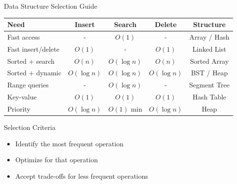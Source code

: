 \documentclass[aspectratio=169,xcolor=dvipsnames]{beamer}
\begin{document}
\begin{frame}{Data Structure Selection Guide}
  \begin{table}
    \centering
    \tiny
    \begin{tabular}{lcccc}
      \hline
      \textbf{Need} & \textbf{Insert} & \textbf{Search} & \textbf{Delete} & \textbf{Structure} \\
      \hline
      Fast access & - & $O(1)$ & - & Array / Hash \\
      Fast insert/delete & $O(1)$ & - & $O(1)$ & Linked List \\
      Sorted + search & $O(n)$ & $O(\log n)$ & $O(n)$ & Sorted Array \\
      Sorted + dynamic & $O(\log n)$ & $O(\log n)$ & $O(\log n)$ & BST / Heap \\
      Range queries & - & $O(\log n)$ & - & Segment Tree \\
      Key-value & $O(1)$ & $O(1)$ & $O(1)$ & Hash Table \\
      Priority & $O(\log n)$ & $O(1)$ min & $O(\log n)$ & Heap \\
      \hline
    \end{tabular}
  \end{table}

  \vspace{0.3cm}
  \begin{block}{Selection Criteria}
    \begin{itemize}
      \item Identify the most frequent operation
      \item Optimize for that operation
      \item Accept trade-offs for less frequent operations
    \end{itemize}
  \end{block}
\end{frame}
\end{document}
